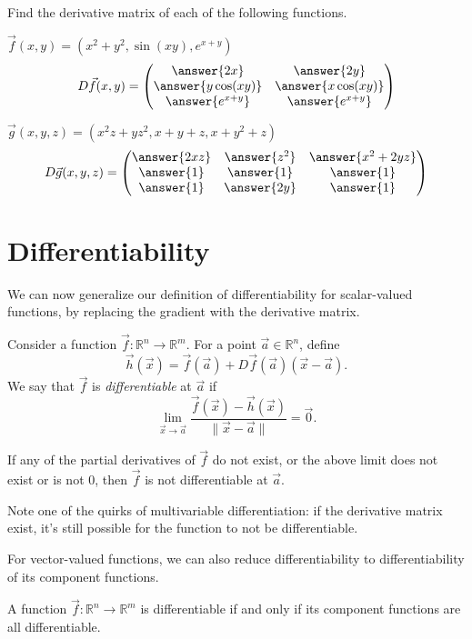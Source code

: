 \documentclass{ximera}
\begin{document}
\begin{problem}
Find the derivative matrix of each of the following functions.

$\vec{f}(x,y) = (x^2+y^2, \sin(xy), e^{x+y})$
\[
D\vec{f}(x,y) =\begin{pmatrix}
\answer{2x} & \answer{2y}\\
\answer{y\cos(xy)} & \answer{x\cos(xy)}\\
\answer{e^{x+y}} & \answer{e^{x+y}}
\end{pmatrix}
\]

$\vec{g}(x,y,z) = (x^2z+yz^2, x+y+z, x+y^2+z)$
\[
D\vec{g}(x,y,z) =\begin{pmatrix}
\answer{2xz} & \answer{z^2} & \answer{x^2+2yz}\\
\answer{1} & \answer{1} & \answer{1}\\
\answer{1} & \answer{2y} & \answer{1}
\end{pmatrix}
\]
\end{problem}

\section*{Differentiability}

We can now generalize our definition of differentiability for scalar-valued functions, by replacing the gradient with the derivative matrix.

\begin{definition}
Consider a function $\vec{f}:\mathbb{R}^n\rightarrow\mathbb{R}^m$. For a point $\vec{a}\in\mathbb{R}^n$, define
\[
\vec{h}(\vec{x}) = \vec{f}(\vec{a})+D\vec{f}(\vec{a})(\vec{x}-\vec{a}).
\]
We say that $\vec{f}$ is \emph{differentiable} at $\vec{a}$ if
\[
\lim_{\vec{x}\rightarrow \vec{a}}\frac{\vec{f}(\vec{x}) - \vec{h}(\vec{x})}{\|\vec{x}-\vec{a}\|} = \vec{0}.
\]

If any of the partial derivatives of $\vec{f}$ do not exist, or the above limit does not exist or is not $0$, then $\vec{f}$ is not differentiable at $\vec{a}$.
\end{definition}

Note one of the quirks of multivariable differentiation: if the derivative matrix exist, it's still possible for the function to not be differentiable.

For vector-valued functions, we can also reduce differentiability to differentiability of its component functions.

\begin{theorem}
A function $\vec{f}:\mathbb{R}^n\rightarrow\mathbb{R}^m$ is differentiable if and only if its component functions are all differentiable.
\end{theorem}
\end{document}
